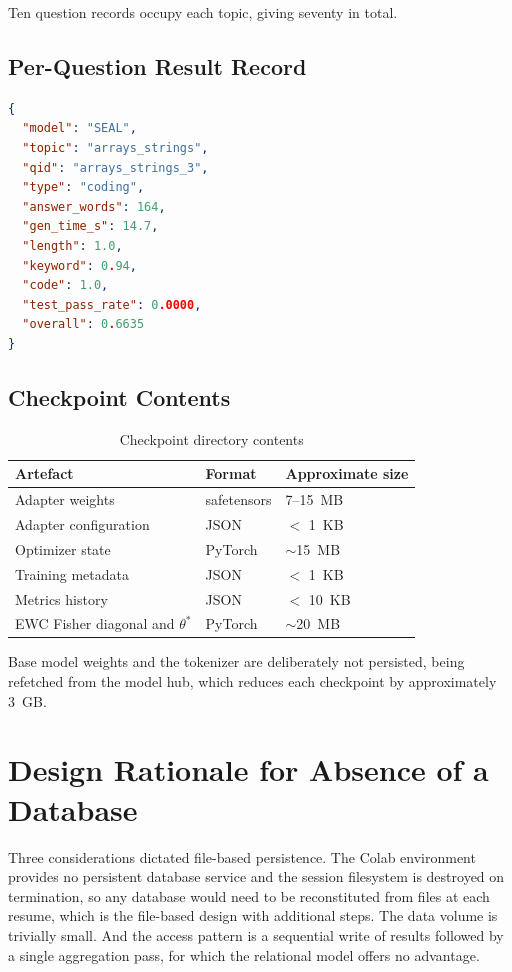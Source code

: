 \documentclass[12pt,a4paper]{report}
\begin{document}
Ten question records occupy each topic, giving seventy in total.

\subsection{Per-Question Result Record}

\begin{lstlisting}[language=json]
{
  "model": "SEAL",
  "topic": "arrays_strings",
  "qid": "arrays_strings_3",
  "type": "coding",
  "answer_words": 164,
  "gen_time_s": 14.7,
  "length": 1.0,
  "keyword": 0.94,
  "code": 1.0,
  "test_pass_rate": 0.0000,
  "overall": 0.6635
}
\end{lstlisting}

\subsection{Checkpoint Contents}

\begin{table}[htbp]
\centering
\caption{Checkpoint directory contents}
\begin{tabular}{>{\raggedright\arraybackslash}p{4cm} p{3cm} p{4cm}}
\toprule
\textbf{Artefact} & \textbf{Format} & \textbf{Approximate size} \\
\midrule
Adapter weights & safetensors & 7--15~MB \\
Adapter configuration & JSON & $<$ 1~KB \\
Optimizer state & PyTorch & $\sim$15~MB \\
Training metadata & JSON & $<$ 1~KB \\
Metrics history & JSON & $<$ 10~KB \\
EWC Fisher diagonal and $\theta^*$ & PyTorch & $\sim$20~MB \\
\bottomrule
\end{tabular}
\end{table}

Base model weights and the tokenizer are deliberately not persisted, being refetched from the model hub, which reduces each checkpoint by approximately 3~GB.

\section{Design Rationale for Absence of a Database}

Three considerations dictated file-based persistence. The Colab environment provides no persistent database service and the session filesystem is destroyed on termination, so any database would need to be reconstituted from files at each resume, which is the file-based design with additional steps. The data volume is trivially small. And the access pattern is a sequential write of results followed by a single aggregation pass, for which the relational model offers no advantage.
\end{document}
